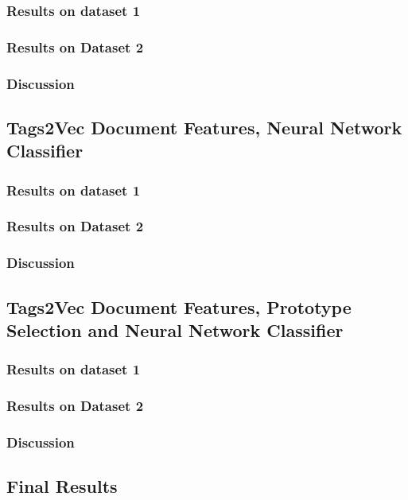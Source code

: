 \subsubsection{Results on dataset 1}

\subsubsection{Results on Dataset 2}

\subsubsection{Discussion}


\subsection{Tags2Vec Document Features, Neural Network Classifier}

\subsubsection{Results on dataset 1}

\subsubsection{Results on Dataset 2}

\subsubsection{Discussion}

\subsection{Tags2Vec Document Features, Prototype Selection and Neural Network Classifier}

\subsubsection{Results on dataset 1}

\subsubsection{Results on Dataset 2}

\subsubsection{Discussion}

\subsection{Final Results}

